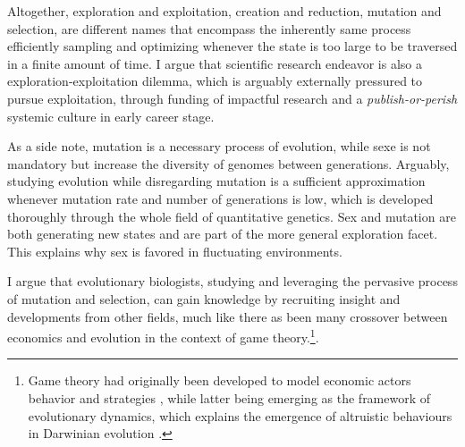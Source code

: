 Altogether, exploration and exploitation, creation and reduction, mutation and selection, are different names that encompass the inherently same process efficiently sampling and optimizing whenever the state is too large to be traversed in a finite amount of time.
I argue that scientific research endeavor is also a exploration-exploitation dilemma, which is arguably externally pressured to pursue exploitation, through funding of impactful research and a \textit{publish-or-perish} systemic culture in early career stage.

As a side note, mutation is a necessary process of evolution, while sexe is not mandatory but increase the diversity of genomes between generations.
Arguably, studying evolution while disregarding mutation is a sufficient approximation whenever mutation rate and number of generations is low, which is developed thoroughly through the whole field of quantitative genetics.
Sex and mutation are both generating new states and are part of the more general exploration facet.
This explains why sex is favored in fluctuating environments.

I argue that evolutionary biologists, studying and leveraging the pervasive process of mutation and selection, can gain knowledge by recruiting insight and developments from other fields, much like there as been many crossover between economics and evolution in the context of game theory.\footnote{Game theory had originally been developed to model economic actors behavior and strategies \citep{VonNeumann1947}, while latter being emerging as the framework of evolutionary dynamics, which explains the emergence of altruistic behaviours in Darwinian evolution \citep{Smith1973, Smith1982, Nowak2006}.}.


